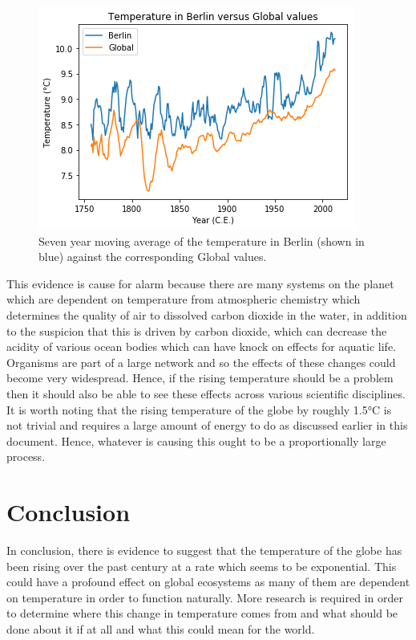 \documentclass[journal, a4paper]{IEEEtran}
\begin{document}
	\begin{figure}[tbh]
		\begin{center}
		\includegraphics[width=\columnwidth]{7DayMovingAverageTemperaturePlot.png}
		\caption{Seven year moving average of the temperature in Berlin (shown in blue) against the corresponding Global values.}
		\label{fig2}
		\end{center}
	\end{figure}
    
    This evidence is cause for alarm because there are many systems on the planet which are dependent on temperature from atmospheric chemistry which determines the quality of air to dissolved carbon dioxide in the water, in addition to the suspicion that this is driven by carbon dioxide, which can decrease the acidity of various ocean bodies which can have knock on effects for aquatic life. Organisms are part of a large network and so the effects of these changes could become very widespread. Hence, if the rising temperature should be a problem then it should also be able to see these effects across various scientific disciplines. It is worth noting that the rising temperature of the globe by roughly 1.5°C is not trivial and requires a large amount of energy to do as discussed earlier in this document. Hence, whatever is causing this ought to be a proportionally large process.

\section{Conclusion}
	In conclusion, there is evidence to suggest that the temperature of the globe has been rising over the past century at a rate which seems to be exponential. This could have a profound effect on global ecosystems as many of them are dependent on temperature in order to function naturally. More research is required in order to determine where this change in temperature comes from and what should be done about it if at all and what this could mean for the world.

\end{document}
